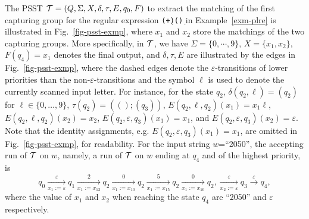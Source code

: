 \begin{example}
The PSST $\mathcal{T}=(Q, \Sigma, X, \delta, \tau, E,  q_{0}, F)$ to extract the matching of the first capturing group for the regular expression \texttt{(\d+)(\d*)} in Example~\ref{exm-plre} is illustrated in Fig.~\ref{fig-psst-exmp}, where $x_1$ and $x_2$ store the matchings of the two capturing groups. More specifically, in $\mathcal{T}$, we have $\Sigma = \{0,\cdots,9\}$, $X= \{x_1,x_2\}$, $F(q_{4}) = x_1$ denotes the final output, and $\delta, \tau, E$ are illustrated by the edges in Fig.~\ref{fig-psst-exmp}, where the dashed edges denote the $\varepsilon$-transitions of lower priorities than the non-$\varepsilon$-transitions and the symbol $\ell$ is used to denote the currently scanned input letter. For instance, for the state $q_2$, $\delta(q_2, \ell) = (q_2)$ for $\ell \in \{0,\ldots, 9\}$, $\tau(q_2) = (();(q_3))$, $E(q_2, \ell, q_2)(x_1) = x_1 \ell$, $E(q_2, \ell, q_2)(x_2) = x_2$,  $E(q_2, \varepsilon, q_3)(x_1) = x_1$, and $E(q_2, \varepsilon, q_3)(x_2) = \varepsilon$. Note that the identity assignments, e.g. $E(q_2, \varepsilon, q_3)(x_1) = x_1$, are omitted in Fig.~\ref{fig-psst-exmp}, for readability.  For the input string $w$=``2050'', the accepting run of $\mathcal{T}$ on $w$, namely, a run of $\mathcal{T}$ on $w$ ending at $q_4$ and of the highest priority, is 
\[
q_0 \xrightarrow[x_1:=\varepsilon]{\varepsilon} q_1 \xrightarrow[x_1:=x_12]{2} q_2  \xrightarrow[x_1:=x_10]{0} q_2  \xrightarrow[x_1:=x_15]{5} q_2  \xrightarrow[x_1:=x_10]{0} q_2,  \xrightarrow[x_2:=\varepsilon]{\varepsilon} q_3  \xrightarrow{\varepsilon} q_4,
\]
where the value of $x_1$ and $x_2$ when reaching the state $q_4$ are ``2050'' and $\varepsilon$ respectively. 

\begin{figure}[ht]


\end{figure}
\end{example}
